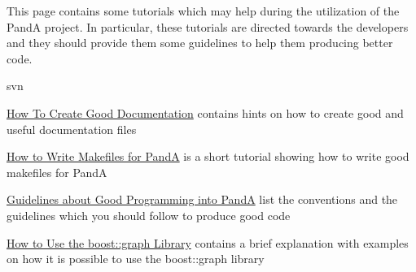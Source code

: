 This page contains some tutorials which may help during the utilization of the PandA project. In particular, these tutorials are directed towards the developers and they should provide them some guidelines to help them producing better code.


\begin{DoxyItemize}
\item svn
\item \hyperlink{documentation_how_to}{How To Create Good Documentation} contains hints on how to create good and useful documentation files
\item \hyperlink{makefiles_how_to}{How to Write Makefiles for PandA} is a short tutorial showing how to write good makefiles for PandA
\item \hyperlink{programming_style}{Guidelines about Good Programming into PandA} list the conventions and the guidelines which you should follow to produce good code
\item \hyperlink{graphs_how_to}{How to Use the boost\+::graph Library} contains a brief explanation with examples on how it is possible to use the boost\+::graph library 
\end{DoxyItemize}